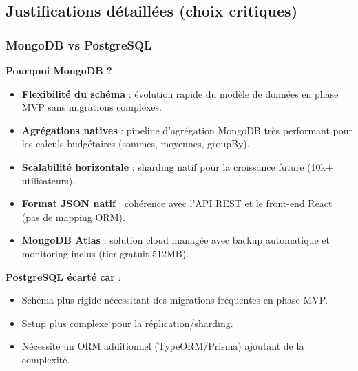 \subsection{Justifications détaillées (choix critiques)}

\subsubsection{MongoDB vs PostgreSQL}

\textbf{Pourquoi MongoDB ?}
\begin{itemize}
  \item \textbf{Flexibilité du schéma} : évolution rapide du modèle de données en phase MVP sans migrations complexes.
  \item \textbf{Agrégations natives} : pipeline d'agrégation MongoDB très performant pour les calculs budgétaires (sommes, moyennes, groupBy).
  \item \textbf{Scalabilité horizontale} : sharding natif pour la croissance future (10k+ utilisateurs).
  \item \textbf{Format JSON natif} : cohérence avec l'API REST et le front-end React (pas de mapping ORM).
  \item \textbf{MongoDB Atlas} : solution cloud managée avec backup automatique et monitoring inclus (tier gratuit 512MB).
\end{itemize}

\textbf{PostgreSQL écarté car} :
\begin{itemize}
  \item Schéma plus rigide nécessitant des migrations fréquentes en phase MVP.
  \item Setup plus complexe pour la réplication/sharding.
  \item Nécessite un ORM additionnel (TypeORM/Prisma) ajoutant de la complexité.
\end{itemize}

